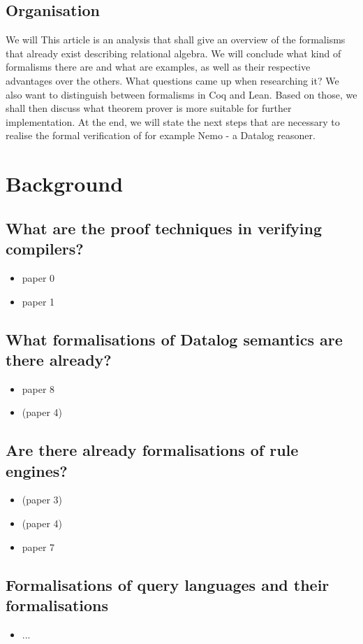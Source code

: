 \documentclass[]{article}
\begin{document}
\subsection{Organisation}
We will 
This article is an analysis that shall give an overview of the formalisms that already exist describing relational algebra.
We will conclude what kind of formalisms there are and what are examples, as well as their respective advantages over the others.
What questions came up when researching it?
We also want to distinguish between formalisms in Coq and Lean.
Based on those, we shall then discuss what theorem prover is more suitable for further implementation.
At the end, we will state the next steps that are necessary to realise the formal verification of for example Nemo - a Datalog reasoner.

\section{Background}
\subsection{What are the proof techniques in verifying compilers?}
    \begin{itemize}
	\item paper 0 
	\item paper 1 
    \end{itemize}
\subsection{What formalisations of Datalog semantics are there already?}
    \begin{itemize}
	\item paper 8
	\item (paper 4)
    \end{itemize}
\subsection{Are there already formalisations of rule engines?}
    \begin{itemize}
	\item (paper 3)
	\item (paper 4)
	\item paper 7
    \end{itemize}
\subsection{Formalisations of query languages and their formalisations}
    \begin{itemize}
	\item ... 
    \end{itemize}
\end{document}

